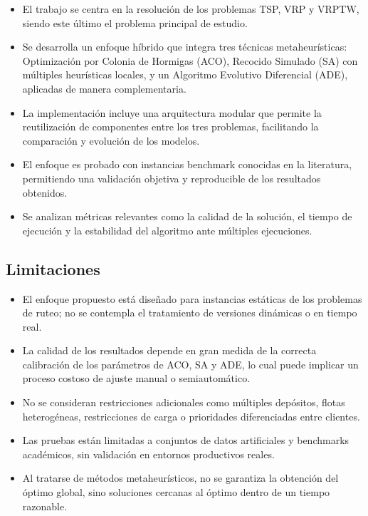 \documentclass[12pt,titlepage,twoside,openright]{book}
\begin{document}
\begin{itemize}
    \item El trabajo se centra en la resolución de los problemas TSP, VRP y VRPTW, siendo este último el problema principal de estudio.
    
    \item Se desarrolla un enfoque híbrido que integra tres técnicas metaheurísticas: Optimización por Colonia de Hormigas (ACO), Recocido Simulado (SA) con múltiples heurísticas locales, y un Algoritmo Evolutivo Diferencial (ADE), aplicadas de manera complementaria.
    
    \item La implementación incluye una arquitectura modular que permite la reutilización de componentes entre los tres problemas, facilitando la comparación y evolución de los modelos.
    
    \item El enfoque es probado con instancias benchmark conocidas en la literatura, permitiendo una validación objetiva y reproducible de los resultados obtenidos.
    
    \item Se analizan métricas relevantes como la calidad de la solución, el tiempo de ejecución y la estabilidad del algoritmo ante múltiples ejecuciones.
\end{itemize}

\subsection*{Limitaciones}

\begin{itemize}
    \item El enfoque propuesto está diseñado para instancias estáticas de los problemas de ruteo; no se contempla el tratamiento de versiones dinámicas o en tiempo real.
    
    \item La calidad de los resultados depende en gran medida de la correcta calibración de los parámetros de ACO, SA y ADE, lo cual puede implicar un proceso costoso de ajuste manual o semiautomático.
    
    \item No se consideran restricciones adicionales como múltiples depósitos, flotas heterogéneas, restricciones de carga o prioridades diferenciadas entre clientes.
    
    \item Las pruebas están limitadas a conjuntos de datos artificiales y benchmarks académicos, sin validación en entornos productivos reales.
    
    \item Al tratarse de métodos metaheurísticos, no se garantiza la obtención del óptimo global, sino soluciones cercanas al óptimo dentro de un tiempo razonable.
\end{itemize}
\end{document}
